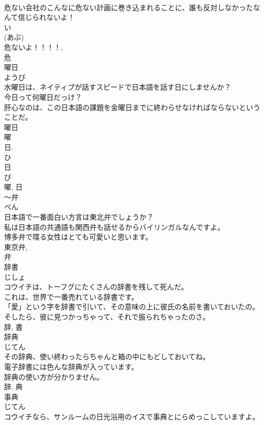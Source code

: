 \documentclass[8pt]{extreport}
\begin{document}
\begin{CJK}{UTF8}{min}
\\	危ない会社のこんなに危ない計画に巻き込まれることに、誰も反対しなかったなんて信じられないよ！	
\\	い 
\\	(あぶ) 
\\	危ないよ！！！！, 
\\	危	
\\	曜日	
\\	ようび	
\\	水曜日は、ネイティブが話すスピードで日本語を話す日にしませんか？	
\\	今日って何曜日だっけ？	
\\	肝心なのは、この日本語の課題を金曜日までに終わらせなければならないということだ。	
\\	曜日 
\\	曜 
\\	日. 
\\	ひ 
\\	日 
\\	び 
\\	曜, 日	
\\	〜弁	
\\	べん	
\\	日本語で一番面白い方言は東北弁でしょうか？	
\\	私は日本語の共通語も関西弁も話せるからバイリンガルなんですよ。	
\\	博多弁で喋る女性はとても可愛いと思います。	
\\	東京弁, 
\\	弁	
\\	辞書	
\\	じしょ	
\\	コウイチは、トーフグにたくさんの辞書を残して死んだ。	
\\	これは、世界で一番売れている辞書です。	
\\	「愛」という字を辞書で引いて、その意味の上に彼氏の名前を書いておいたの。そしたら、彼に見つかっちゃって、それで振られちゃったのさ。	
\\	辞, 書	
\\	辞典	
\\	じてん	
\\	その辞典、使い終わったらちゃんと箱の中にもどしておいてね。	
\\	電子辞書には色んな辞典が入っています。	
\\	辞典の使い方が分かりません。	
\\	辞, 典	
\\	事典	
\\	じてん	
\\	コウイチなら、サンルームの日光浴用のイスで事典とにらめっこしていますよ。	

\end{CJK}
\end{document}
